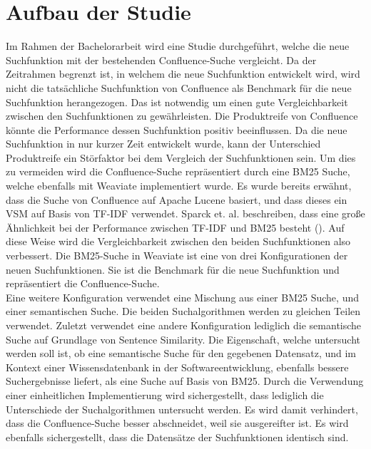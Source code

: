 \section{Aufbau der Studie}
\label{chap:aufbau-der-studie}
Im Rahmen der Bachelorarbeit wird eine Studie durchgeführt, welche die neue Suchfunktion mit der bestehenden Confluence-Suche vergleicht.
Da der Zeitrahmen begrenzt ist, in welchem die neue Suchfunktion entwickelt wird, wird nicht die tatsächliche Suchfunktion von Confluence als Benchmark für die neue Suchfunktion herangezogen.
Das ist notwendig um einen gute Vergleichbarkeit zwischen den Suchfunktionen zu gewährleisten.
Die Produktreife von Confluence könnte die Performance dessen Suchfunktion positiv beeinflussen.
Da die neue Suchfunktion in nur kurzer Zeit entwickelt wurde, kann der Unterschied Produktreife ein Störfaktor bei dem Vergleich der Suchfunktionen sein.
Um dies zu vermeiden wird die Confluence-Suche repräsentiert durch eine BM25 Suche, welche ebenfalls mit Weaviate implementiert wurde. 
Es wurde bereits erwähnt, dass die Suche von Confluence auf Apache Lucene basiert, und dass dieses ein VSM auf Basis von TF-IDF verwendet.
Sparck et. al. beschreiben, dass eine große Ähnlichkeit bei der Performance zwischen TF-IDF und BM25 besteht (\cite{Sparck_Jones_Walker_Robertson_2000}).
Auf diese Weise wird die Vergleichbarkeit zwischen den beiden Suchfunktionen also verbessert.
Die BM25-Suche in Weaviate ist eine von drei Konfigurationen der neuen Suchfunktionen.
Sie ist die Benchmark für die neue Suchfunktion und repräsentiert die Confluence-Suche.\\

Eine weitere Konfiguration verwendet eine Mischung aus einer BM25 Suche, und einer semantischen Suche.
Die beiden Suchalgorithmen werden zu gleichen Teilen verwendet.
Zuletzt verwendet eine andere Konfiguration lediglich die semantische Suche auf Grundlage von Sentence Similarity.
Die Eigenschaft, welche untersucht werden soll ist, ob eine semantische Suche für den gegebenen Datensatz, und im Kontext einer Wissensdatenbank in der Softwareentwicklung, ebenfalls bessere Suchergebnisse liefert, als eine Suche auf Basis von BM25.
Durch die Verwendung einer einheitlichen Implementierung wird sichergestellt, dass lediglich die Unterschiede der Suchalgorithmen untersucht werden.
Es wird damit verhindert, dass die Confluence-Suche besser abschneidet, weil sie ausgereifter ist.
Es wird ebenfalls sichergestellt, dass die Datensätze der Suchfunktionen identisch sind.\\

